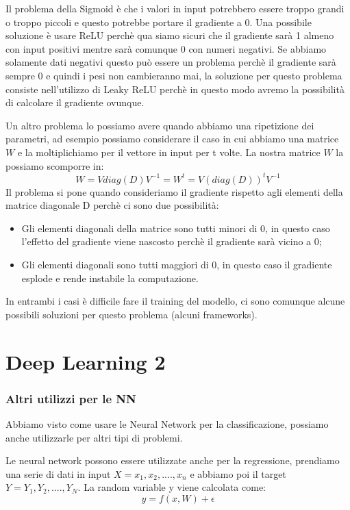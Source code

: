 \documentclass[14pt]{extreport}
\begin{document}
Il problema della Sigmoid è che i valori in input potrebbero essere troppo grandi o troppo piccoli e questo potrebbe portare il gradiente a 0. Una
possibile soluzione è usare ReLU perchè qua siamo sicuri che il gradiente sarà 1 almeno con input positivi mentre sarà comunque 0 con numeri negativi.
Se abbiamo solamente dati negativi questo può essere un problema perchè il gradiente sarà sempre 0 e quindi i pesi non cambieranno mai, la soluzione
per questo problema consiste nell'utilizzo di Leaky ReLU perchè in questo modo avremo la possibilità di calcolare il gradiente ovunque.

Un altro problema lo possiamo avere quando abbiamo una ripetizione dei parametri, ad esempio possiamo considerare il caso in cui abbiamo una matrice
$W$ e la moltiplichiamo per il vettore in input per t volte. La nostra matrice $W$ la possiamo scomporre in:
$$W = V diag(D) V^{-1} = W^{t} = V(diag(D))^tV^{-1}$$ Il problema si pone quando consideriamo il gradiente rispetto agli elementi della matrice
diagonale D perchè ci sono due possibilità:
\begin{itemize}
\item Gli elementi diagonali della matrice sono tutti minori di 0, in questo caso l'effetto del gradiente viene nascosto perchè il gradiente sarà
vicino a 0;
\item Gli elementi diagonali sono tutti maggiori di 0, in questo caso il gradiente esplode e rende instabile la computazione.
\end{itemize}

In entrambi i casi è difficile fare il training del modello, ci sono comunque alcune possibili soluzioni per questo problema (alcuni frameworks).


\chapter{Deep Learning 2}

\subsection{Altri utilizzi per le NN}

Abbiamo visto come usare le Neural Network per la classificazione, possiamo anche utilizzarle per altri tipi di problemi.

Le neural network possono essere utilizzate anche per la regressione, prendiamo una serie di dati in input $X = {x_1, x_2,....,x_n}$ e abbiamo poi il
target $Y = {Y_1,Y_2,....,Y_N}$. La random variable y viene calcolata come: $$y = f(x,W) + \epsilon$$
\end{document}
